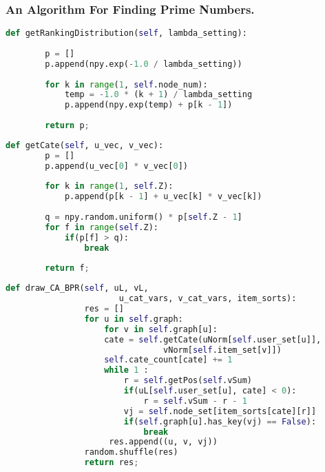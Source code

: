\begin{frame}[fragile]
	\frametitle{An Algorithm For Finding Prime Numbers.}
	\begin{lstlisting}[language=python,xleftmargin=-4em,xrightmargin=2em, aboveskip=1em,framexleftmargin = -4em,framexrightmargin = 4em]
	def getRankingDistribution(self, lambda_setting):
	
	    p = []
	    p.append(npy.exp(-1.0 / lambda_setting))
	    
	    for k in range(1, self.node_num):
	        temp = -1.0 * (k + 1) / lambda_setting
	        p.append(npy.exp(temp) + p[k - 1])
	        
	    return p;
	\end{lstlisting}
	
\end{frame}

\begin{frame}[fragile]
	
	\begin{lstlisting}[language=python,xleftmargin=-4em,xrightmargin=2em, aboveskip=1em,framexleftmargin = -4em,framexrightmargin = 4em]
	def getCate(self, u_vec, v_vec):
	    p = []
	    p.append(u_vec[0] * v_vec[0])
	    
	    for k in range(1, self.Z):
	        p.append(p[k - 1] + u_vec[k] * v_vec[k])
	    
	    q = npy.random.uniform() * p[self.Z - 1]
	    for f in range(self.Z):
	        if(p[f] > q):
	            break
	            
	    return f;
	\end{lstlisting}
\end{frame}


\begin{frame}[fragile]
			\begin{lstlisting}[language=python,xleftmargin=-15em,xrightmargin=2em, aboveskip=0.2em,framexleftmargin = -14em,framexrightmargin = 4em]
			def draw_CA_BPR(self, uL, vL,
			           u_cat_vars, v_cat_vars, item_sorts):
			    res = []
			    for u in self.graph:
			        for v in self.graph[u]:
			        cate = self.getCate(uNorm[self.user_set[u]], 
			                    vNorm[self.item_set[v]])
			        self.cate_count[cate] += 1
			        while 1 :
			            r = self.getPos(self.vSum)
			            if(uL[self.user_set[u], cate] < 0):
			                r = self.vSum - r - 1
			            vj = self.node_set[item_sorts[cate][r]] 
			            if(self.graph[u].has_key(vj) == False):
			                break
			         res.append((u, v, vj))
			    random.shuffle(res)
			    return res;
			\end{lstlisting}
	
\end{frame}

